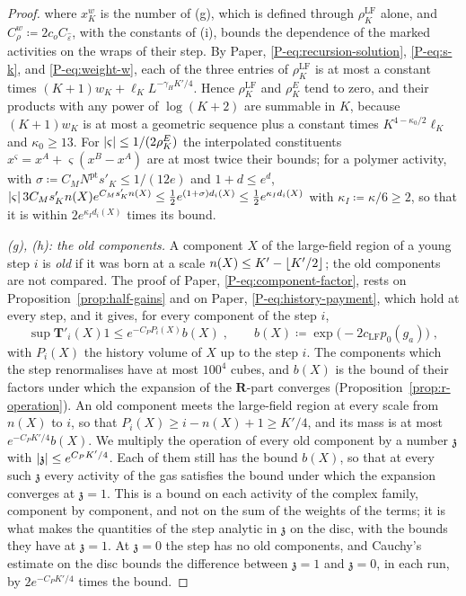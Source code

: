 \documentclass[11pt]{preprint}
\DeclarePairedDelimiter{\abs}{\lvert}{\rvert}
\DeclarePairedDelimiter{\floor}{\lfloor}{\rfloor}
\numberwithin{equation}{section}
\theoremstyle{definition}
\theoremstyle{remark}
\theoremstyle{plain}
\begin{document}
\begin{proof}
where $x^w_K$ is the number of (g), which is defined through $\rho^{\mathrm{LF}}_K$ alone, and $C^w_\rho \coloneqq 2c_oC_{\hat\varepsilon}$, with the constants of (i), bounds the dependence of the marked activities on the wraps of their step. By Paper, \eqref{P-eq:recursion-solution}, \eqref{P-eq:s-k}, and \eqref{P-eq:weight-w}, each of the three entries of $\rho^{\mathrm{LF}}_K$ is at most a constant times $(K + 1)w_K + \ell_KL^{-\gamma_HK'/4}$. Hence $\rho^{\mathrm{LF}}_K$ and $\rho^E_K$ tend to zero, and their products with any power of $\log(K + 2)$ are summable in $K$, because $(K + 1)w_K$ is at most a geometric sequence plus a constant times $K^{4-\kappa_0/2}\ell_K$ and $\kappa_0 \geq 13$. For $\abs\varsigma \leq 1/(2\rho^E_K)$ the interpolated constituents $x^\varsigma = x^A + \varsigma(x^B - x^A)$ are at most twice their bounds; for a polymer activity, with $\sigma \coloneqq C_MN^{\mathrm{pt}}s'_K \leq 1/(12e)$ and $1 + d \leq e^d$, $\abs\varsigma\,3C_Ms'_Kn(X)e^{C_Ms'_Kn(X)} \leq \frac12e^{(1+\sigma)d_i(X)} \leq \frac12e^{\kappa_Id_i(X)}$ with $\kappa_I \coloneqq \kappa/6 \geq 2$, so that it is within $2e^{\kappa_Id_i(X)}$ times its bound.

\emph{(g), (h): the old components.} A component $X$ of the large-field region of a young step $i$ is \emph{old} if it was born at a scale $n(X) \leq K' - \floor{K'/2}$; the old components are not compared. The proof of Paper, \eqref{P-eq:component-factor}, rests on Proposition~\ref{prop:half-gains} and on Paper, \eqref{P-eq:history-payment}, which hold at every step, and it gives, for every component of the step $i$,
\begin{equation}\label{eq:old-mass}
    \sup\mathbf T'_i(X)1 \leq e^{-C_PP_i(X)}b(X)\;,
    \qquad
    b(X) \coloneqq \exp\bigl(-2c_{\mathrm{LF}}p_0(g_a)\bigr)\;,
\end{equation}
with $P_i(X)$ the history volume of $X$ up to the step $i$. The components which the step renormalises have at most $100^4$ cubes, and $b(X)$ is the bound of their factors under which the expansion of the $\mathbf R$-part converges (Proposition~\ref{prop:r-operation}). An old component meets the large-field region at every scale from $n(X)$ to $i$, so that $P_i(X) \geq i - n(X) + 1 \geq K'/4$, and its mass is at most $e^{-C_PK'/4}b(X)$. We multiply the operation of every old component by a number $\mathfrak z$ with $\abs{\mathfrak z} \leq e^{C_PK'/4}$. Each of them still has the bound $b(X)$, so that at every such $\mathfrak z$ every activity of the gas satisfies the bound under which the expansion converges at $\mathfrak z = 1$. This is a bound on each activity of the complex family, component by component, and not on the sum of the weights of the terms; it is what makes the quantities of the step analytic in $\mathfrak z$ on the disc, with the bounds they have at $\mathfrak z = 1$. At $\mathfrak z = 0$ the step has no old components, and Cauchy's estimate on the disc bounds the difference between $\mathfrak z = 1$ and $\mathfrak z = 0$, in each run, by $2e^{-C_PK'/4}$ times the bound.


\end{proof}
\end{document}
